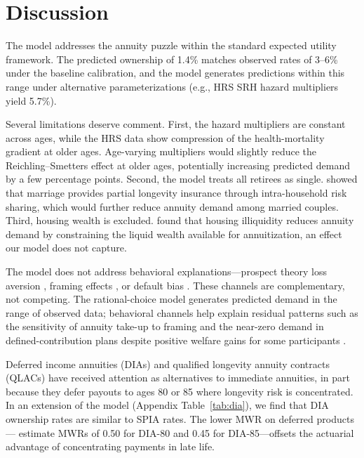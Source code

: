 \documentclass[12pt]{article}
\begin{document}
\section{Discussion}
\label{sec:discussion}

The model addresses the annuity puzzle within the standard expected utility framework. The predicted ownership of 1.4\% matches observed rates of 3--6\% under the baseline calibration, and the model generates predictions within this range under alternative parameterizations (e.g., HRS SRH hazard multipliers yield 5.7\%).

Several limitations deserve comment. First, the hazard multipliers are constant across ages, while the HRS data show compression of the health-mortality gradient at older ages. Age-varying multipliers would slightly reduce the Reichling--Smetters effect at older ages, potentially increasing predicted demand by a few percentage points. Second, the model treats all retirees as single. \citet{kotlikoffspivak1981} showed that marriage provides partial longevity insurance through intra-household risk sharing, which would further reduce annuity demand among married couples. Third, housing wealth is excluded. \citet{pashchenko2013} found that housing illiquidity reduces annuity demand by constraining the liquid wealth available for annuitization, an effect our model does not capture.

The model does not address behavioral explanations---prospect theory loss aversion \citep{huscott2007}, framing effects \citep{brown2008framing}, or default bias \citep{madrian2001, chalmersreuter2012}. These channels are complementary, not competing. The rational-choice model generates predicted demand in the range of observed data; behavioral channels help explain residual patterns such as the sensitivity of annuity take-up to framing \citep{brown2008framing, beshears2014} and the near-zero demand in defined-contribution plans despite positive welfare gains for some participants \citep{chalmersreuter2012}.

Deferred income annuities (DIAs) and qualified longevity annuity contracts (QLACs) have received attention as alternatives to immediate annuities, in part because they defer payouts to ages 80 or 85 where longevity risk is concentrated. In an extension of the model (Appendix Table~\ref{tab:dia}), we find that DIA ownership rates are similar to SPIA rates. The lower MWR on deferred products---\citet{wettstein2021} estimate MWRs of 0.50 for DIA-80 and 0.45 for DIA-85---offsets the actuarial advantage of concentrating payments in late life.
\end{document}
